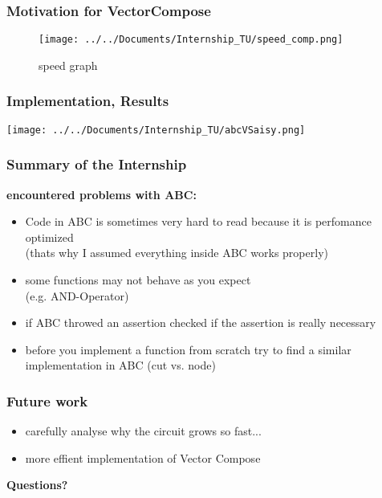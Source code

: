 \documentclass{beamer}
\begin{document}
\begin{frame}
\frametitle{Motivation for VectorCompose}

\begin{figure}
\texttt{[image: ../../Documents/Internship\_TU/speed\_comp.png]} 
\caption{speed graph}
\end{figure}
 
\end{frame}


\begin{frame}
\frametitle{Implementation, Results}

\texttt{[image: ../../Documents/Internship\_TU/abcVSaisy.png]} 

\end{frame}

\begin{frame}
\frametitle{Summary of the Internship}

\textbf{encountered problems with ABC:}\\

\begin{itemize}
\item<1-> Code in ABC is sometimes very hard to read because it is perfomance optimized\\ 
	  (thats why I assumed everything inside ABC works properly)
\item<2-> some functions may not behave as you expect \\
	  (e.g. AND-Operator)
\item<3-> if ABC throwed an assertion checked if the assertion is really necessary
\item<4-> before you implement a function from scratch try to find a similar 			implementation in ABC (cut vs. node)

\end{itemize}

\end{frame}




\begin{frame}
\frametitle{Future work}

\begin{itemize}

\item carefully analyse why the circuit grows so fast...\\
\item more effient implementation of Vector Compose

\end{itemize}
\end{frame}



\begin{frame}

\begin{center}
{\LARGE \textbf{Questions?}}
\end{center}

\end{frame}
\end{document}
